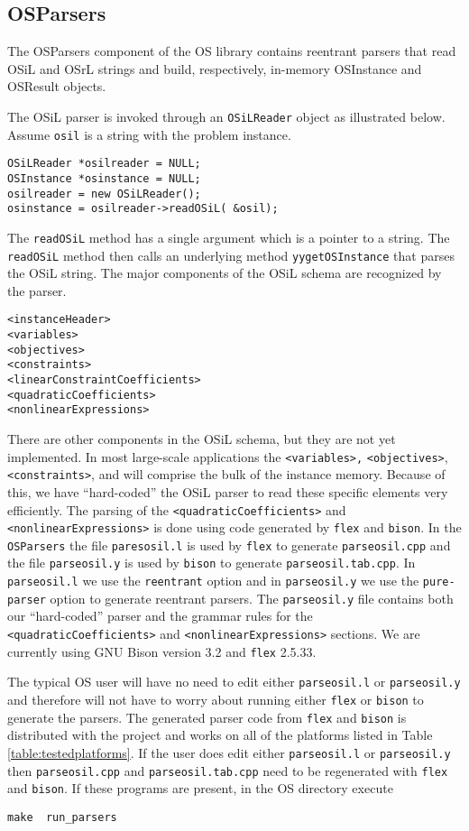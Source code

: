 \documentclass[11pt]{article}
\renewcommand{\_}{{\char"5F}}
\renewcommand{\{}{{\char"7B}}
\renewcommand{\}}{{\char"7D}}
\renewcommand{\^}{{\char"0D}}
\renewcommand{\'}{{\char"0D}}
\begin{document}
\subsection{OSParsers}

The OSParsers component of the OS library contains reentrant parsers that  read OSiL and OSrL strings and build, respectively, in-memory OSInstance and OSResult  objects. 


The OSiL parser is invoked through an {\tt OSiLReader} object as illustrated below. Assume {\tt osil} is a string with the problem instance.
\begin{verbatim}
OSiLReader *osilreader = NULL;
OSInstance *osinstance = NULL;
osilreader = new OSiLReader(); 
osinstance = osilreader->readOSiL( &osil);
\end{verbatim}
The {\tt  readOSiL} method  has a single argument which is a pointer to a string. The {\tt  readOSiL} method then calls an underlying method {\tt yygetOSInstance} that parses the OSiL string. The major components of the OSiL schema are recognized by the parser.
\begin{verbatim}
<instanceHeader>
<variables>
<objectives>
<constraints>
<linearConstraintCoefficients>
<quadraticCoefficients>
<nonlinearExpressions>
\end{verbatim}
There are other components in the OSiL schema, but they are not yet implemented. In most large-scale applications the {\tt <variables>,} {\tt <objectives>}, {\tt <constraints>}, and {\tt }  will comprise the bulk of the instance memory.  Because of this, we have ``hard-coded'' the OSiL parser to read these specific elements very efficiently. The parsing of the {\tt <quadraticCoefficients>} and {\tt <nonlinearExpressions>} is done using code generated by {\tt flex} and {\tt bison}. In the {\tt OSParsers}  the file  {\tt paresosil.l} is used by {\tt flex} to generate {\tt parseosil.cpp} and the file {\tt parseosil.y} is used by {\tt bison} to generate {\tt parseosil.tab.cpp}.  In {\tt parseosil.l} we use the {\tt reentrant} option and in {\tt parseosil.y} we use the {\tt pure-parser} option to generate reentrant parsers. The {\tt parseosil.y} file  contains both our  ``hard-coded'' parser and the grammar rules for the  {\tt <quadraticCoefficients>} and {\tt <nonlinearExpressions>} sections.   We are currently using GNU Bison version 3.2 and {\tt flex} 2.5.33.

The typical OS user will have no need to edit either {\tt parseosil.l} or {\tt parseosil.y} and therefore will not have to worry about running either {\tt flex} or {\tt bison} to generate the parsers. The generated parser code from {\tt flex} and {\tt bison} is distributed with the project and works on all of the platforms listed in Table \ref{table:testedplatforms}.  If the user does edit either {\tt parseosil.l} or {\tt parseosil.y} then {\tt parseosil.cpp} and {\tt parseosil.tab.cpp} need to be regenerated with {\tt flex} and {\tt bison}. If these programs are present, in the OS directory  execute
\begin{verbatim}
make  run_parsers
\end{verbatim}
\end{document}
